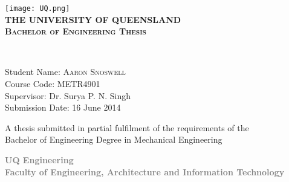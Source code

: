 \begin{titlepage}

\begin{center}

\texttt{[image: UQ.png]}\\[1.5cm]    

\textsc{\Large \bfseries {\Huge T}HE {\Huge U}NIVERSITY OF {\Huge Q}UEENSLAND}\\[2cm]

\textsc{\large \bfseries Bachelor of Engineering Thesis}\\[1.5cm]


\newlength{\mylength}

\setlength{\fboxsep}{1pt}
\setlength{\mylength}{\linewidth}

\addtolength{\mylength}{-1.5\fboxsep}
\addtolength{\mylength}{-1.5\fboxrule}


		
\textsc{}\\[1.5cm]

\begin{minipage}{0.8\textwidth}
\begin{flushleft} \large
Student Name: \textsc{Aaron Snoswell}\\[0.1cm]
Course Code: METR4901\\[0.1cm]
Supervisor: Dr. Surya P. N. Singh\\[0.1cm]
Submission Date: 16 June 2014\\[0.1cm]
\end{flushleft}
\end{minipage}




\vfill


{\small A thesis submitted in partial fulfilment of the requirements of the\\
Bachelor of Engineering Degree in Mechanical Engineering\\[1.5cm]}

\textcolor{Gray}
{
{\small  \bfseries UQ Engineering\\[0.5cm]
Faculty of Engineering, Architecture and Information Technology}
}


\end{center}

\end{titlepage}